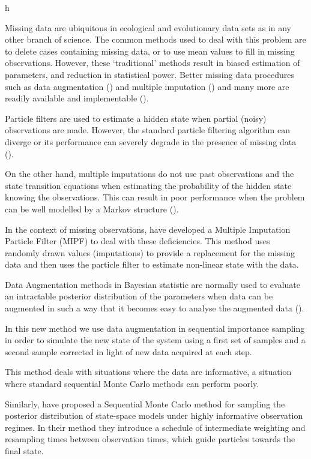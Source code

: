 h\documentclass[11pt,a4paper]{article}
\begin{document}
Missing data are ubiquitous in ecological and evolutionary data sets as in any other branch of science. The common methods used to deal with this problem are to delete cases containing missing data, or to use mean values to fill in missing observations. However, these ‘traditional’ methods result in biased estimation of parameters, and reduction in statistical power. Better missing data procedures such as data augmentation (\cite{Tanner}) and multiple imputation (\cite{RubinMI}) and many more are readily available and implementable (\cite{Nakagawa}).

Particle filters are used to estimate a hidden state when partial (noisy) observations are made. However, the standard particle filtering algorithm can diverge or its performance can severely degrade in the presence of missing data (\cite{Zhang}).

On the other hand, multiple imputations do not use past observations and the state transition equations when estimating the probability of the hidden state knowing the observations. This can result in poor performance when the problem can be well modelled by a Markov structure (\cite{Zhang}).

In the context of missing observations, \cite{Zhang} have developed a Multiple Imputation Particle Filter (MIPF) to deal with these deficiencies. This method uses randomly drawn values (imputations) to provide a replacement for the missing data and then uses the particle filter to estimate non-linear state with the data.

Data Augmentation methods in Bayesian statistic are normally used to evaluate an intractable posterior distribution of the parameters when data can be augmented in such a way that it becomes easy to analyse the augmented data (\cite{Tanner}).

In this new method we use data augmentation in sequential importance sampling in order to simulate the new state of the system using a first set of samples and a second sample corrected in light of new data acquired at each step.

This method deals with situations where the data are informative, a situation where standard sequential Monte Carlo methods can perform poorly. 

Similarly, \cite{Del Moral} have proposed a Sequential Monte Carlo method for sampling the posterior distribution of state-space models under highly informative observation regimes. In their method they introduce a schedule of intermediate weighting and resampling times between observation times, which guide particles towards the final state.
\end{document}
